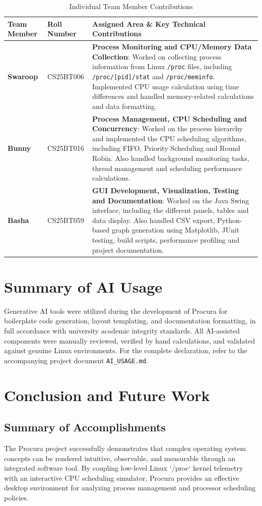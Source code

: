 \documentclass[12pt,a4paper]{article}
\begin{document}
\begin{table}[H]
\centering
\caption{Individual Team Member Contributions}
\label{tab:contributions}
\begin{tabular}{@{}llp{8.5cm}@{}}
\toprule
\textbf{Team Member} & \textbf{Roll Number} & \textbf{Assigned Area \& Key Technical Contributions} \\ \midrule
\textbf{Swaroop} & CS25BT006 & \textbf{Process Monitoring and CPU/Memory Data Collection}: Worked on collecting process information from Linux \texttt{/proc} files, including \texttt{/proc/[pid]/stat} and \texttt{/proc/meminfo}. Implemented CPU usage calculation using time differences and handled memory-related calculations and data formatting. \\ \addlinespace
\textbf{Bunny} & CS25BT016 & \textbf{Process Management, CPU Scheduling and Concurrency}: Worked on the process hierarchy and implemented the CPU scheduling algorithms, including FIFO, Priority Scheduling and Round Robin. Also handled background monitoring tasks, thread management and scheduling performance calculations. \\ \addlinespace
\textbf{Basha} & CS25BT059 & \textbf{GUI Development, Visualization, Testing and Documentation}: Worked on the Java Swing interface, including the different panels, tables and data display. Also handled CSV export, Python-based graph generation using Matplotlib, JUnit testing, build scripts, performance profiling and project documentation. \\ \bottomrule
\end{tabular}
\end{table}

\section{Summary of AI Usage}
Generative AI tools were utilized during the development of Procura for boilerplate code generation, layout templating, and documentation formatting, in full accordance with university academic integrity standards. All AI-assisted components were manually reviewed, verified by hand calculations, and validated against genuine Linux environments. For the complete declaration, refer to the accompanying project document \texttt{AI\_USAGE.md}.

\section{Conclusion and Future Work}
\subsection{Summary of Accomplishments}
The Procura project successfully demonstrates that complex operating system concepts can be rendered intuitive, observable, and measurable through an integrated software tool. By coupling low-level Linux `/proc` kernel telemetry with an interactive CPU scheduling simulator, Procura provides an effective desktop environment for analyzing process management and processor scheduling policies.
\end{document}

